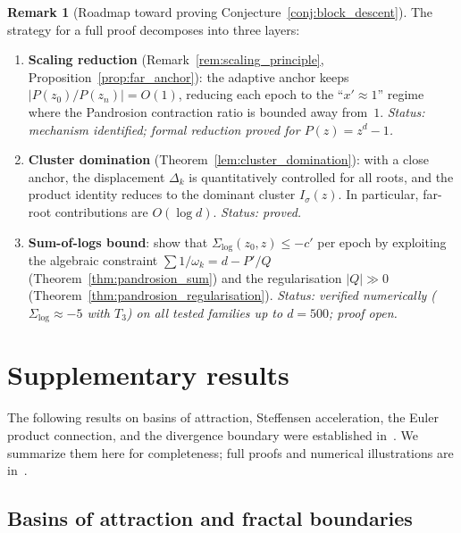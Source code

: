 \documentclass[11pt,a4paper]{article}
\theoremstyle{definition}
\newtheorem{remark}{Remark}[section]
\begin{document}
\begin{remark}[Roadmap toward proving Conjecture~\ref{conj:block_descent}]
\label{rem:roadmap}
The strategy for a full proof decomposes into three layers:
\begin{enumerate}
  \item \textbf{Scaling reduction} (Remark~\ref{rem:scaling_principle}, Proposition~\ref{prop:far_anchor}): the adaptive anchor keeps $|P(z_0)/P(z_n)| = O(1)$, reducing each epoch to the ``$x' \approx 1$'' regime where the Pandrosion contraction ratio is bounded away from~$1$.  \emph{Status: mechanism identified; formal reduction proved for $P(z) = z^d - 1$.}
  \item \textbf{Cluster domination} (Theorem~\ref{lem:cluster_domination}): with a close anchor, the displacement $\Delta_k$ is quantitatively controlled for all roots, and the product identity reduces to the dominant cluster $I_\sigma(z)$.  In particular, far-root contributions are $O(\log d)$.  \emph{Status: proved.}
  \item \textbf{Sum-of-logs bound}: show that $\Sigma_{\log}(z_0,z) \leq -c'$ per epoch by exploiting the algebraic constraint $\sum 1/\omega_k = d - P'/Q$ (Theorem~\ref{thm:pandrosion_sum}) and the regularisation $|Q| \gg 0$ (Theorem~\ref{thm:pandrosion_regularisation}).  \emph{Status: verified numerically ($\Sigma_{\log} \approx -5$ with $T_3$) on all tested families up to $d = 500$; proof open.}
\end{enumerate}
\end{remark}

\section{Supplementary results}
\label{sec:supplementary}

The following results on basins of attraction, Steffensen acceleration, the Euler product connection, and the divergence boundary were established in~\cite{besevic2026complex}.  We summarize them here for completeness; full proofs and numerical illustrations are in~\cite{besevic2026complex}.

\subsection{Basins of attraction and fractal boundaries}
\label{sec:basins}
\end{document}
